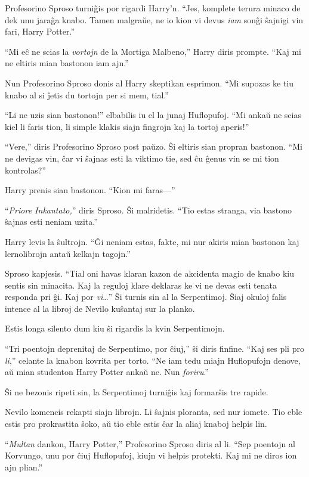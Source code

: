 Profesorino Sproso turniĝis por rigardi Harry'n. ``Jes, komplete terura minaco
de dek unu jaraĝa knabo. Tamen malgraŭe, ne io kion vi devus \emph{iam} sonĝi
ŝajnigi vin fari, Harry Potter.''

``Mi eĉ ne scias la \emph{vortojn} de la Mortiga Malbeno,'' Harry diris
prompte. ``Kaj mi ne eltiris mian bastonon iam ajn.''

Nun Profesorino Sproso donis al Harry skeptikan esprimon. ``Mi supozas ke tiu
knabo al si ĵetis du tortojn per si mem, tial.''

``Li ne uzis sian bastonon!'' elbabilis iu el la junaj
Huflopufoj. ``Mi ankaŭ ne scias kiel li faris tion, li simple klakis
siajn fingrojn kaj la tortoj aperis!''

``Vere,'' diris Profesorino Sproso post paŭzo. Ŝi eltiris sian propran bastonon.
``Mi ne devigas vin, ĉar vi ŝajnas esti la viktimo tie, sed ĉu ĝenus vin se mi
tion kontrolas?''

Harry prenis sian bastonon. ``Kion mi faras—''

``\emph{Priore Inkantato,}'' diris Sproso. Ŝi malridetis. ``Tio estas
stranga, via bastono ŝajnas esti neniam uzita.''

Harry levis la ŝultrojn. ``Ĝi neniam estas, fakte, mi nur akiris mian
bastonon kaj lernolibrojn antaŭ kelkajn tagojn.''

Sproso kapjesis. ``Tial oni havas klaran kazon de akcidenta magio de knabo kiu
sentis sin minacita. Kaj la reguloj klare deklaras ke vi ne devas esti tenata
responda pri ĝi. Kaj por \emph{vi}\ldots'' Ŝi turnis sin al la Serpentimoj. Ŝiaj
okuloj falis intence al la libroj de Nevilo kuŝantaj sur la planko.

Estis longa silento dum kiu ŝi rigardis la kvin Serpentimojn.

``Tri poentojn deprenitaj de Serpentimo, por ĉiuj,'' ŝi diris finfine. ``Kaj ses
pli pro \emph{li},'' celante la knabon kovrita per torto. ``Ne iam tedu
miajn Huflopufojn denove, aŭ mian studenton Harry Potter ankaŭ ne. Nun
\emph{foriru}.''

Ŝi ne bezonis ripeti sin, la Serpentimoj turniĝis kaj formarŝis tre rapide.

Nevilo komencis rekapti siajn librojn. Li ŝajnis ploranta, sed nur iomete. Tio
eble estis pro prokrastita ŝoko, aŭ tio eble estis ĉar la aliaj knaboj helpis
lin.

``\emph{Multan} dankon, Harry Potter,'' Profesorino Sproso diris al li. ``Sep
poentojn al Korvungo, unu por ĉiuj Huflopufoj, kiujn vi helpis protekti. Kaj mi
ne diros ion ajn plian.''

